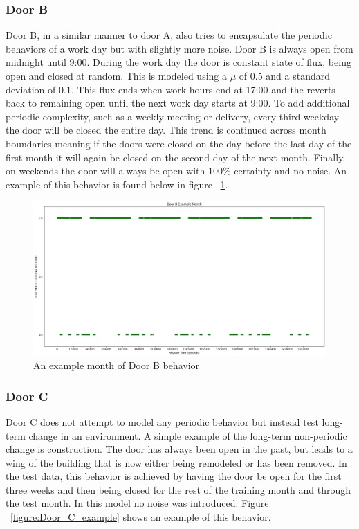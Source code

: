   \subsubsection{ Door B }

  Door B, in a similar manner to door A, also tries to encapsulate the periodic
  behaviors of a work day but with slightly more noise. Door B is always open
  from midnight until 9:00. During the work day
  the door is constant state of flux, being open and closed at random. This is
  modeled using a $\mu$ of 0.5 and a standard deviation of 0.1. This flux ends when
  work hours end at 17:00 and the reverts back to remaining open until
  the next work day starts at 9:00. To add additional periodic complexity, such as a
  weekly meeting or delivery, every third weekday the door will be closed the
  entire day. This trend is continued across month boundaries meaning if
  the doors were closed on the day before the last day of the first month it
  will again be closed on the second day of the next month. Finally, on
  weekends the door will always be open with 100\% certainty and no noise. An
  example of this behavior is found below in figure ~\ref{figure:Door_B_example}. \\

  \begin{figure}[!htb]
    \centering
    \includegraphics[width=\linewidth]{images/Door_B_Example_Month.png}
    \caption{An example month of Door B behavior}
    \label{figure:Door_B_example}
  \end{figure}

  \subsubsection{ Door C }

  Door C does not attempt to model any periodic behavior but instead test
  long-term change in an environment. A simple example of the long-term
  non-periodic change is construction. The door has always been
  open in the past, but leads to a wing of the building that is now either
  being remodeled or has been removed. In the test data, this behavior is
  achieved by having the door be open for the first three weeks and then being
  closed for the rest of the training month and through the test month. In
  this model no noise was introduced. Figure ~\ref{figure:Door_C_example} shows
  an example of this behavior.\\

